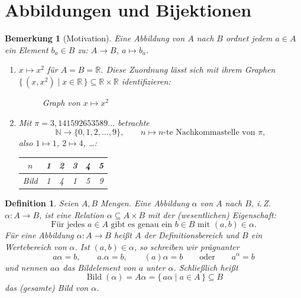 \documentclass[a4paper]{article}
\theoremstyle{kurzskript}
\newtheorem{definition}[satz]{Definition}
\newtheorem{bemerkung}[satz]{Bemerkung}
\newcommand{\N}{\mathbb{N}}
\newcommand{\R}{\mathbb{R}}
\begin{document}
\section{Abbildungen und Bijektionen}

\begin{bemerkung}[Motivation]
Eine Abbildung von $A$ nach $B$ ordnet jedem $a \in A$ ein Element $b_a \in B$ zu: $A \to B$, $a \mapsto b_a$.
\begin{enumerate}[label=(\arabic*)]
  \item $x \mapsto x^2$ für $A = B = \R$. Diese Zuordnung lässt sich mit ihrem Graphen $\{\, (x, x^2) \mid x \in \R \,\} \subseteq \R \times \R$ identifizieren:
  \begin{figure}[H]
  \centering
  \caption{Graph von $x \mapsto x^2$}
  \end{figure}

  \item Mit $\pi = 3{,}141592653589\ldots$ betrachte
  \[
    \N \to \{0, 1, 2, \dots, 9\}, \qquad n \mapsto n\text{-te Nachkommastelle von } \pi,
  \]
  also $1 \mapsto 1$, $2 \mapsto 4$, \dots:
  \begin{center}
  \begin{tabular}{c|ccccc}
  $n$ & 1 & 2 & 3 & 4 & 5 \\\hline
  Bild & 1 & 4 & 1 & 5 & 9
  \end{tabular}
  \end{center}
\end{enumerate}
\end{bemerkung}

\begin{definition}
Seien $A, B$ Mengen. Eine \emph{Abbildung} $\alpha$ von $A$ nach $B$, i.\,Z.\ $\alpha\colon A \to B$, ist eine Relation $\alpha \subseteq A \times B$ mit der (wesentlichen) Eigenschaft:
\[
  \text{Für jedes } a \in A \text{ gibt es genau ein } b \in B \text{ mit } (a, b) \in \alpha.
\]
Für eine Abbildung $\alpha\colon A \to B$ heißt $A$ der \emph{Definitionsbereich} und $B$ \emph{ein Wertebereich} von $\alpha$. Ist $(a, b) \in \alpha$, so schreiben wir prägnanter
\[
  a\alpha = b, \qquad a.\alpha = b, \qquad (a)\alpha = b \qquad\text{oder}\qquad a^\alpha = b
\]
und nennen $a\alpha$ das \emph{Bildelement} von $a$ unter $\alpha$. Schließlich heißt
\[
  \operatorname{Bild}(\alpha) = A\alpha = \{\, a\alpha \mid a \in A \,\} \subseteq B
\]
das (gesamte) \emph{Bild} von $\alpha$.
\end{definition}
\end{document}
